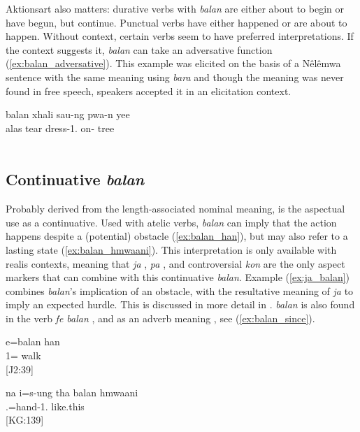  Aktionsart also matters: durative verbs with \textit{balan} are either about to begin or have begun, but continue. Punctual verbs have either happened or are about to happen. Without context, certain verbs seem to have preferred interpretations. If the context suggests it, \textit{balan} can take an adversative function (\ref{ex:balan_adversative}). This example was elicited on the basis of a Nêlêmwa sentence with the same meaning using \textit{bara} \parencite[238]{bril_nelemwa_2002} and though the meaning  was never found in free speech, speakers accepted it in an elicitation context.

\ea \label{ex:balan_adversative} 
\gll balan xhali sau-ng pwa-n yee	\\
 alas tear dress-1. on- tree	\\
\glt {}\\\relax 
[181016-jpgramm1, 00:12:56-00:12:58]
\z

\subsection{Continuative \textit{balan}}
 Probably derived from the length-associated nominal meaning, is the aspectual use as a continuative. Used with atelic verbs, \textit{balan} can imply that the action happens despite a (potential) obstacle (\ref{ex:balan_han}), but may also refer to a lasting state (\ref{ex:balan_hmwaani}). This interpretation is only available with realis contexts, meaning that \textit{ja} , \textit{pa} , and controversial \textit{kon}  are the only aspect markers that can combine with this continuative \textit{balan}. Example (\ref{ex:ja_balan}) combines \textit{balan}'s implication of an obstacle, with the resultative meaning of \textit{ja} to imply an expected hurdle. This is discussed in more detail in . \textit{balan} is also found in the verb \textit{fe balan} , and as an adverb meaning , see (\ref{ex:balan_since}).
 

 \ea\label{ex:balan_han}
 \gll e=balan han\\
  1= walk\\
 \glt {} {[J2:39]}
 \z
 
 
 \ea\label{ex:balan_hmwaani}
 \gll na i=s-ung tha balan hmwaani\\
   .=hand-1.   like.this\\
 \glt {} {[KG:139]}
 \z
 
